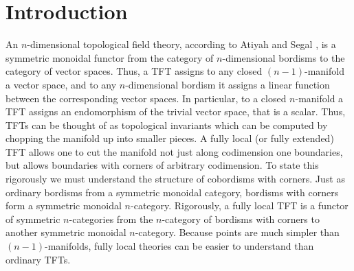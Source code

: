 \documentclass{amsart}
\begin{document}




\section{Introduction}
An $n$-dimensional topological field theory, according to Atiyah and Segal \cite{MR1001453,Segal}, is a symmetric monoidal functor from the category of $n$-dimensional bordisms to the category of vector spaces.  Thus, a TFT assigns to any closed $(n-1)$-manifold a vector space, and to any $n$-dimensional bordism it assigns a linear function between the corresponding vector spaces.  In particular, to a closed $n$-manifold a TFT assigns an endomorphism of the trivial vector space, that is a scalar.  Thus, TFTs can be thought of as topological invariants which can be computed by chopping the manifold up into smaller pieces.  A fully local (or fully extended) TFT allows one to cut the manifold not just along codimension one boundaries, but allows boundaries with corners of arbitrary codimension.  To state this rigorously we must understand the structure of cobordisms with corners.  Just as ordinary bordisms from a symmetric monoidal category, bordisms with corners  form a symmetric monoidal $n$-category.  Rigorously, a fully local TFT is a functor of symmetric $n$-categories from the $n$-category of bordisms with corners to another symmetric monoidal $n$-category.  Because points are much simpler than $(n-1)$-manifolds, fully local theories can be easier to understand than ordinary TFTs.
\end{document}
